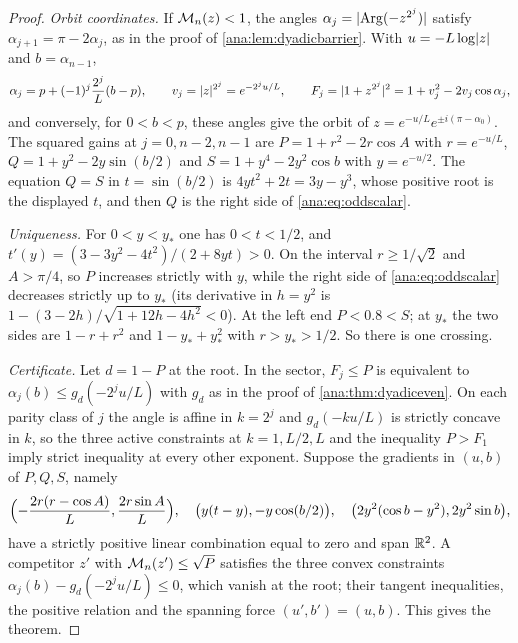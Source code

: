 \begin{proof}
\emph{Orbit coordinates.} If $\mathcal{M}_n(z)<1$, the angles
$\alpha_j=\lvert\operatorname{Arg}(-z^{2^j})\rvert$ satisfy $\alpha_{j+1}=\pi-2\alpha_j$, as in the
proof of \cref{ana:lem:dyadicbarrier}. With $u=-L\log\lvert z\rvert$ and $b=\alpha_{n-1}$,
\[
 \alpha_j=p+(-1)^j\frac{2^j}L(b-p),\qquad v_j=\lvert z\rvert^{2^j}=e^{-2^ju/L},\qquad
 F_j=\lvert1+z^{2^j}\rvert^2=1+v_j^2-2v_j\cos\alpha_j ,
\]
and conversely, for $0<b<p$, these angles give the orbit of $z=e^{-u/L}e^{\pm i(\pi-\alpha_0)}$.
The squared gains at $j=0,n-2,n-1$ are $P=1+r^2-2r\cos A$ with $r=e^{-u/L}$,
$Q=1+y^2-2y\sin(b/2)$ and $S=1+y^4-2y^2\cos b$ with $y=e^{-u/2}$. The equation $Q=S$ in
$t=\sin(b/2)$ is $4yt^2+2t=3y-y^3$, whose positive root is the displayed $t$, and then $Q$
is the right side of \eqref{ana:eq:oddscalar}.

\emph{Uniqueness.} For $0<y<y_*$ one has $0<t<1/2$, and $t'(y)=(3-3y^2-4t^2)/(2+8yt)>0$. On
the interval $r\ge1/\sqrt2$ and $A>\pi/4$, so $P$ increases strictly with $y$, while the
right side of \eqref{ana:eq:oddscalar} decreases strictly up to $y_*$ (its derivative in
$h=y^2$ is $1-(3-2h)/\sqrt{1+12h-4h^2}<0$). At the left end $P<0.8<S$; at $y_*$ the two
sides are $1-r+r^2$ and $1-y_*+y_*^2$ with $r>y_*>1/2$. So there is one crossing.

\emph{Certificate.} Let $d=1-P$ at the root. In the sector, $F_j\le P$ is equivalent to
$\alpha_j(b)\le g_d(-2^ju/L)$ with $g_d$ as in the proof of \cref{ana:thm:dyadiceven}. On
each parity class of $j$ the angle is affine in $k=2^j$ and $g_d(-ku/L)$ is strictly concave
in $k$, so the three active constraints at $k=1,L/2,L$ and the inequality $P>F_1$ imply strict
inequality at every other exponent. Suppose the gradients in $(u,b)$ of $P,Q,S$, namely
\[
 \Bigl(-\frac{2r(r-\cos A)}L,\frac{2r\sin A}L\Bigr),\quad\bigl(y(t-y),-y\cos(b/2)\bigr),\quad
 \bigl(2y^2(\cos b-y^2),2y^2\sin b\bigr),
\]
have a strictly positive linear combination equal to zero and span $\mathbb{R}^2$. A competitor $z'$
with $\mathcal{M}_n(z')\le\sqrt P$ satisfies the three convex constraints
$\alpha_j(b)-g_d(-2^ju/L)\le0$, which vanish at the root; their tangent inequalities, the
positive relation and the spanning force $(u',b')=(u,b)$. This gives the theorem.


\end{proof}
